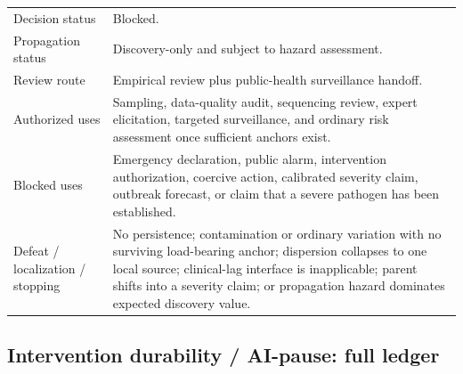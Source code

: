 \documentclass[10pt]{article}
\begin{document}
\begin{longtable}{@{}p{}p{}@{}}
Decision status & Blocked. \\
Propagation status & Discovery-only and subject to hazard assessment. \\
Review route & Empirical review plus public-health surveillance handoff. \\
Authorized uses & Sampling, data-quality audit, sequencing review, expert elicitation, targeted surveillance, and ordinary risk assessment once sufficient anchors exist. \\
Blocked uses & Emergency declaration, public alarm, intervention authorization, coercive action, calibrated severity claim, outbreak forecast, or claim that a severe pathogen has been established. \\
Defeat / localization / stopping & No persistence; contamination or ordinary variation with no surviving load-bearing anchor; dispersion collapses to one local source; clinical-lag interface is inapplicable; parent shifts into a severity claim; or propagation hazard dominates expected discovery value. \\
\end{longtable}

\subsection{Intervention durability / AI-pause: full ledger}
\end{document}
